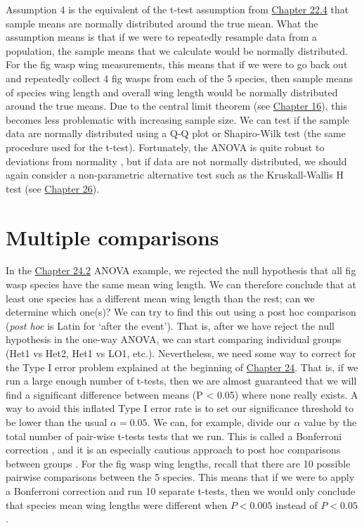 \documentclass[
  openany]{krantz}
\begin{document}
Assumption 4 is the equivalent of the t-test assumption from \protect\hyperlink{assumptions-of-t-tests}{Chapter 22.4} that sample means are normally distributed around the true mean.
What the assumption means is that if we were to repeatedly resample data from a population, the sample means that we calculate would be normally distributed.
For the fig wasp wing measurements, this means that if we were to go back out and repeatedly collect 4 fig wasps from each of the 5 species, then sample means of species wing length and overall wing length would be normally distributed around the true means.
Due to the central limit theorem (see \protect\hyperlink{Chapter_16}{Chapter 16}), this becomes less problematic with increasing sample size.
We can test if the sample data are normally distributed using a Q-Q plot or Shapiro-Wilk test (the same procedure used for the t-test).
Fortunately, the ANOVA is quite robust to deviations from normality \citep{Schmider2010}, but if data are not normally distributed, we should again consider a non-parametric alternative test such as the Kruskall-Wallis H test (see \protect\hyperlink{Chapter_26}{Chapter 26}).

\hypertarget{Chapter_25}{%
\chapter{Multiple comparisons}\label{Chapter_25}}

In the \protect\hyperlink{one-way-anova}{Chapter 24.2} ANOVA example, we rejected the null hypothesis that all fig wasp species have the same mean wing length.
We can therefore conclude that at least one species has a different mean wing length than the rest; can we determine which one(s)?
We can try to find this out using a post hoc comparison (\emph{post hoc} is Latin for `after the event').
That is, after we have reject the null hypothesis in the one-way ANOVA, we can start comparing individual groups (Het1 vs Het2, Het1 vs LO1, etc.).
Nevertheless, we need some way to correct for the Type I error problem explained at the beginning of \protect\hyperlink{Chapter_24}{Chapter 24}.
That is, if we run a large enough number of t-tests, then we are almost guaranteed that we will find a significant difference between means (P \textless{} 0.05) where none really exists.
A way to avoid this inflated Type I error rate is to set our significance threshold to be lower than the usual \(\alpha = 0.05\).
We can, for example, divide our \(\alpha\) value by the total number of pair-wise t-tests tests that we run.
This is called a Bonferroni correction \citep{Dytham2011}, and it is an especially cautious approach to post hoc comparisons between groups \citep{Narum2006}.
For the fig wasp wing lengths, recall that there are 10 possible pairwise comparisons between the 5 species.
This means that if we were to apply a Bonferroni correction and run 10 separate t-tests, then we would only conclude that species mean wing lengths were different when \(P < 0.005\) instead of \(P < 0.05\).
\end{document}
